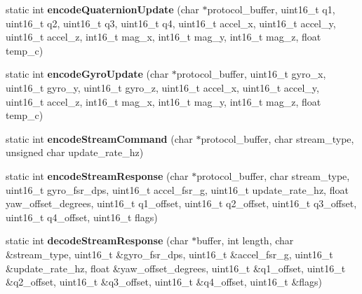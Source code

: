 \begin{DoxyCompactItemize}
\item 
\hypertarget{class_i_m_u_protocol_a2076e198a0111d24e7312302529c11fa}{}static int {\bfseries encode\+Quaternion\+Update} (char $\ast$protocol\+\_\+buffer, uint16\+\_\+t q1, uint16\+\_\+t q2, uint16\+\_\+t q3, uint16\+\_\+t q4, uint16\+\_\+t accel\+\_\+x, uint16\+\_\+t accel\+\_\+y, uint16\+\_\+t accel\+\_\+z, int16\+\_\+t mag\+\_\+x, int16\+\_\+t mag\+\_\+y, int16\+\_\+t mag\+\_\+z, float temp\+\_\+c)\label{class_i_m_u_protocol_a2076e198a0111d24e7312302529c11fa}

\item 
\hypertarget{class_i_m_u_protocol_a2ae8e5f0bfe45485ab475335fad6e889}{}static int {\bfseries encode\+Gyro\+Update} (char $\ast$protocol\+\_\+buffer, uint16\+\_\+t gyro\+\_\+x, uint16\+\_\+t gyro\+\_\+y, uint16\+\_\+t gyro\+\_\+z, uint16\+\_\+t accel\+\_\+x, uint16\+\_\+t accel\+\_\+y, uint16\+\_\+t accel\+\_\+z, int16\+\_\+t mag\+\_\+x, int16\+\_\+t mag\+\_\+y, int16\+\_\+t mag\+\_\+z, float temp\+\_\+c)\label{class_i_m_u_protocol_a2ae8e5f0bfe45485ab475335fad6e889}

\item 
\hypertarget{class_i_m_u_protocol_a900c9f6e4174c510765f8885f07bd0e9}{}static int {\bfseries encode\+Stream\+Command} (char $\ast$protocol\+\_\+buffer, char stream\+\_\+type, unsigned char update\+\_\+rate\+\_\+hz)\label{class_i_m_u_protocol_a900c9f6e4174c510765f8885f07bd0e9}

\item 
\hypertarget{class_i_m_u_protocol_a47edf8d27c46da8cb395c14a726a9732}{}static int {\bfseries encode\+Stream\+Response} (char $\ast$protocol\+\_\+buffer, char stream\+\_\+type, uint16\+\_\+t gyro\+\_\+fsr\+\_\+dps, uint16\+\_\+t accel\+\_\+fsr\+\_\+g, uint16\+\_\+t update\+\_\+rate\+\_\+hz, float yaw\+\_\+offset\+\_\+degrees, uint16\+\_\+t q1\+\_\+offset, uint16\+\_\+t q2\+\_\+offset, uint16\+\_\+t q3\+\_\+offset, uint16\+\_\+t q4\+\_\+offset, uint16\+\_\+t flags)\label{class_i_m_u_protocol_a47edf8d27c46da8cb395c14a726a9732}

\item 
\hypertarget{class_i_m_u_protocol_a97c641e18f3881b989a8f89fcb08458c}{}static int {\bfseries decode\+Stream\+Response} (char $\ast$buffer, int length, char \&stream\+\_\+type, uint16\+\_\+t \&gyro\+\_\+fsr\+\_\+dps, uint16\+\_\+t \&accel\+\_\+fsr\+\_\+g, uint16\+\_\+t \&update\+\_\+rate\+\_\+hz, float \&yaw\+\_\+offset\+\_\+degrees, uint16\+\_\+t \&q1\+\_\+offset, uint16\+\_\+t \&q2\+\_\+offset, uint16\+\_\+t \&q3\+\_\+offset, uint16\+\_\+t \&q4\+\_\+offset, uint16\+\_\+t \&flags)\label{class_i_m_u_protocol_a97c641e18f3881b989a8f89fcb08458c}


\end{DoxyCompactItemize}
